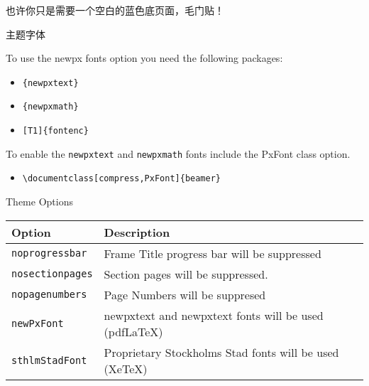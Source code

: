 \documentclass[newPxFont,sthlmFooter]{beamer}
\begin{document}
\begingroup
{}
\begin{frame}

也许你只是需要一个空白的蓝色底页面，毛门贴！


\end{frame}
\endgroup


\begin{frame}[containsverbatim]{主题字体}

To use the newpx fonts option you need the following packages:

\begin{itemize}
	\item \verb|{newpxtext}|
	\item \verb|{newpxmath}|
	\item \verb|[T1]{fontenc}|
\end{itemize}

To enable the \verb|newpxtext| and \verb|newpxmath| fonts include the \alert{PxFont} class option.\\

\begin{itemize}
	\item \verb|\documentclass[compress,PxFont]{beamer}|
\end{itemize}

\end{frame}


\begin{frame}{Theme Options}
\begin{table}[]
	\begin{tabularx}{\linewidth}{l>{\raggedright}X}
		\toprule
		\textbf{Option}			& \textbf{Description} \tabularnewline
		\midrule
		\texttt{noprogressbar} & Frame Title progress bar will be suppressed \tabularnewline
		\texttt{nosectionpages} & Section pages will be suppressed.\tabularnewline
		\texttt{nopagenumbers} & Page Numbers will be suppresed \tabularnewline
		\texttt{newPxFont} & newpxtext and newpxtext fonts will be used (pdfLaTeX) \tabularnewline
		\texttt{sthlmStadFont} & Proprietary Stockholms Stad fonts will be used (XeTeX) \tabularnewline
		\bottomrule
	\end{tabularx}
	\label{tab:options}
\end{table}
\end{frame}
\end{document}
